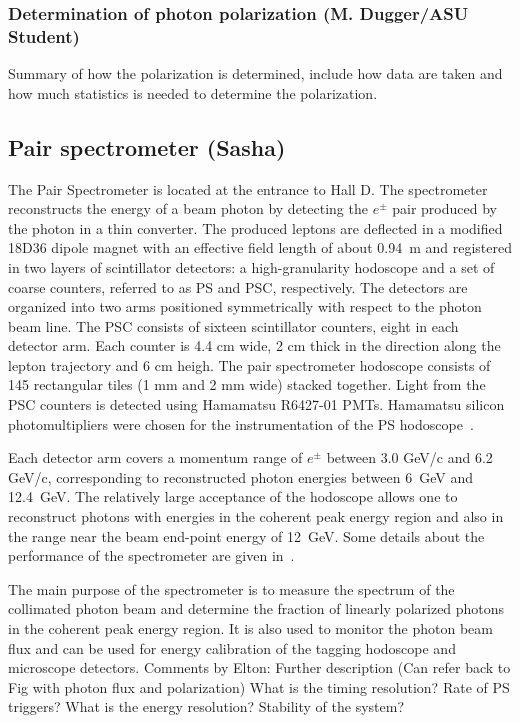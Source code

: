 \subsubsection{Determination of photon polarization (M. Dugger/ASU Student)\label{sec:polarization}}
{\color{red} Summary of how the polarization is determined, include how data are taken and how much statistics is needed to determine the polarization}.

\subsection{Pair spectrometer         (Sasha) \label{sec:ps}}

The Pair Spectrometer \cite{BARBOSA2015376} is located at the entrance to Hall D.
The spectrometer reconstructs the energy of a beam photon by detecting the $e^\pm$ pair produced by the photon in a thin converter. 
The produced leptons are deflected in a modified 18D36 dipole magnet with an effective field length of about 0.94~m and registered in two layers of scintillator
detectors: a high-granularity hodoscope and a set of coarse counters,
referred to as PS and PSC, respectively. The detectors are organized into two arms positioned symmetrically with respect to the photon beam line. The PSC consists of sixteen scintillator counters, eight in each detector arm. Each counter is 4.4 cm wide, 2 cm thick in the direction along the lepton trajectory and 6 cm heigh. The pair spectrometer hodoscope consists of 145 rectangular 
tiles (1 mm and 2 mm wide) stacked together. Light from the PSC counters is detected using Hamamatsu R6427-01 PMTs. Hamamatsu silicon photomultipliers were chosen for the instrumentation of the PS hodoscope~\cite{Barbosa:2017zzw,Somov:2017kif,Tolstukhin:2014zsa}.

Each detector arm covers a momentum range of $e^\pm$ between 3.0 GeV/c and 6.2 GeV/c, 
corresponding to reconstructed photon energies between 6~GeV and 12.4~GeV. The relatively
large acceptance of the hodoscope allows one to reconstruct photons
with energies in the coherent peak energy region and also in the range
near the beam end-point energy of 12~GeV. Some details about the performance of the spectrometer are given in~\cite{Somov:2017vhp,Somov:2016bgb}.

The main purpose of the spectrometer is to measure the spectrum of the
collimated photon beam and determine the fraction of linearly polarized
photons in the coherent peak energy region.
It is also used to monitor the photon beam flux and can be used for 
energy calibration of the tagging hodoscope and microscope detectors.
{\color{red} Comments by Elton: Further description (Can refer back to Fig with photon flux and polarization) What is the timing resolution? Rate of PS triggers? What is the energy resolution? Stability of the system?}

